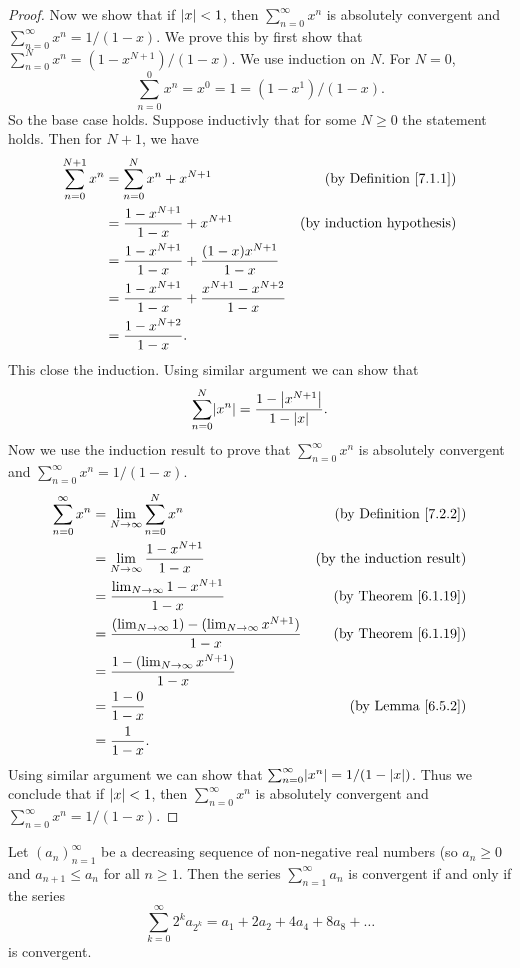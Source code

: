 \begin{proof}
Now we show that if \(\abs*{x} < 1\), then \(\sum_{n = 0}^\infty x^n\) is absolutely convergent and \(\sum_{n = 0}^\infty x^n = 1 / (1 - x)\).
We prove this by first show that \(\sum_{n = 0}^N x^n = (1 - x^{N + 1}) / (1 - x)\).
We use induction on \(N\).
For \(N = 0\),
\[
    \sum_{n = 0}^0 x^n = x^0 = 1 = (1 - x^1) / (1 - x).
\]
So the base case holds.
Suppose inductivly that for some \(N \geq 0\) the statement holds.
Then for \(N + 1\), we have
\begin{align*}
\sum_{n = 0}^{N + 1} x^n &= \sum_{n = 0}^N x^n + x^{N + 1} & \text{(by Definition \ref{7.1.1})} \\
&= \frac{1 - x^{N + 1}}{1 - x} + x^{N + 1} & \text{(by induction hypothesis)} \\
&= \frac{1 - x^{N + 1}}{1 - x} + \frac{(1 - x) x^{N + 1}}{1 - x} \\
&= \frac{1 - x^{N + 1}}{1 - x} + \frac{x^{N + 1} - x^{N + 2}}{1 - x} \\
&= \frac{1 - x^{N + 2}}{1 - x}.
\end{align*}
This close the induction.
Using similar argument we can show that
\[
    \sum_{n = 0}^N \abs*{x^n} = \frac{1 - \abs*{x^{N + 1}}}{1 - \abs*{x}}.
\]
Now we use the induction result to prove that \(\sum_{n = 0}^\infty x^n\) is absolutely convergent and \(\sum_{n = 0}^\infty x^n = 1 / (1 - x)\).
\begin{align*}
\sum_{n = 0}^\infty x^n &= \lim_{N \to \infty} \sum_{n = 0}^N x^n & \text{(by Definition \ref{7.2.2})} \\
&= \lim_{N \to \infty} \frac{1 - x^{N + 1}}{1 - x} & \text{(by the induction result)} \\
&= \frac{\lim_{N \to \infty} 1 - x^{N + 1}}{1 - x} & \text{(by Theorem \ref{6.1.19})} \\
&= \frac{(\lim_{N \to \infty} 1) - (\lim_{N \to \infty} x^{N + 1})}{1 - x} & \text{(by Theorem \ref{6.1.19})} \\
&= \frac{1 - (\lim_{N \to \infty} x^{N + 1})}{1 - x} \\
&= \frac{1 - 0}{1 - x} & \text{(by Lemma \ref{6.5.2})} \\
&= \frac{1}{1 - x}.
\end{align*}
Using similar argument we can show that \(\sum_{n = 0}^\infty \abs*{x^n} = 1 / (1 - \abs*{x})\).
Thus we conclude that if \(\abs*{x} < 1\), then \(\sum_{n = 0}^\infty x^n\) is absolutely convergent and \(\sum_{n = 0}^\infty x^n = 1 / (1 - x)\).
\end{proof}

\begin{proposition}\label{7.3.4}
Let \((a_n)_{n = 1}^\infty\) be a decreasing sequence of non-negative real numbers (so \(a_n \geq 0\) and \(a_{n + 1} \leq a_n\) for all \(n \geq 1\).
Then the series \(\sum_{n = 1}^\infty a_n\) is convergent if and only if the series
\[
    \sum_{k = 0}^\infty 2^k a_{2^k} = a_1 + 2a_2 + 4a_4 + 8a_8 + \dots
\]
is convergent.
\end{proposition}

